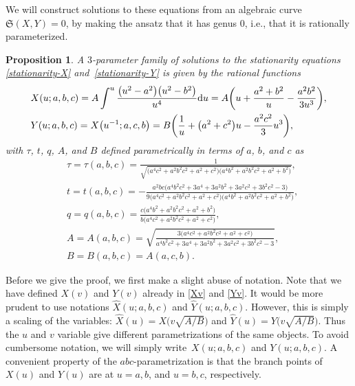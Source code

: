 \documentclass[pdftex]{sigma}
\numberwithin{equation}{section}
\newtheorem{Proposition}[Theorem]{Proposition}
 { \theoremstyle{definition}
\newtheorem{Definition}[Theorem]{Definition}
\newtheorem{Note}[Theorem]{Note}
\newtheorem{Example}[Theorem]{Example}
\newtheorem{Remark}[Theorem]{Remark} }
\begin{document}
We will construct solutions to these equations from an algebraic curve $\mathfrak{S}(X,Y) = 0$, by making the ansatz that it has genus $0$, i.e., that it is rationally parameterized.
\begin{Proposition}
 A $3$-parameter family of solutions to the stationarity equations \eqref{stationarity-X} and~\eqref{stationarity-Y} is given by the rational functions
 \begin{align}
 &X(u;a,b,c)= A \int^u \frac{\bigl(u^2-a^2\bigr)\bigl(u^2-b^2\bigr)}{u^4} {\rm d}u = A\biggl(u + \frac{a^2+b^2}{u} - \frac{a^2b^2}{3u^3}\biggr), \label{X-parameterization}\\
 &Y(u;a,b,c)= X\bigl(u^{-1};a,c,b\bigr) = B\biggl(\frac{1}{u} + \bigl(a^2+c^2\bigr)u - \frac{a^2c^2}{3}u^3\biggr),\nonumber%
 \end{align}
 with $\tau$, $t$, $q$, $A$, and $B$ defined parametrically in terms of $a$, $b$, and $c$ as
 \begin{align}
 &\tau= \tau(a,b,c) = \frac{1}{\sqrt{\bigl(a^4c^2 + a^2b^2c^2 + a^2 + c^2\bigr)\bigl(a^4b^2 + a^2b^2c^2 + a^2 + b^2\bigr)}}, \label{tau-param}\\
 &t= t(a,b,c) = -\frac{a^2bc\bigl(a^4b^2c^2 + 3a^4 + 3a^2b^2 + 3a^2c^2 + 3b^2c^2 - 3\bigr)}{9\bigl(a^4c^2 + a^2b^2c^2 + a^2 + c^2\bigr)\bigl(a^4b^2 + a^2b^2c^2 + a^2 + b^2\bigr)},\label{t-param}\\
 &q= q(a,b,c) = \frac{c\bigl(a^4b^2 + a^2b^2c^2 + a^2 + b^2\bigr)}{b\bigl(a^4c^2 + a^2b^2c^2 + a^2 + c^2\bigr)},\label{q-param}\\
 &A= A(a,b,c) = \sqrt{\frac{3\bigl(a^4c^2 + a^2b^2c^2 + a^2 + c^2\bigr)}{a^4b^2c^2 + 3a^4 + 3a^2b^2 + 3a^2c^2 + 3b^2c^2 - 3}}\label{A-param}, \\
 &B = B(a,b,c) = A(a,c,b).\nonumber
 \end{align}
\end{Proposition}
\begin{Remark}\label{uv-relation-remark} Before we give the proof, we first make a slight abuse of notation. Note that we have defined $X(v)$ and $Y(v)$ already in \eqref{Xv} and \eqref{Yv}. It would be more prudent to use notations $\hat X(u;a,b,c)$ and $\hat Y(u;a,b,c)$. However, this is simply a scaling of the variables: $\hat{X}(u) = X\bigl(v\sqrt{A/B}\bigr)$ and $\hat{Y}(u) = Y\bigl(v\sqrt{A/B}\bigr)$. Thus the $u$ and $v$ variable give different parametrizations of the same objects. To avoid cumbersome notation, we will simply write~$X(u;a,b,c)$ and $Y(u;a,b,c)$. A convenient property of the $abc$-parametrization is that the branch points of $X(u)$ and $Y(u)$ are at $u=a,b$, and $u=b,c$, respectively.
\end{Remark}
\end{document}
